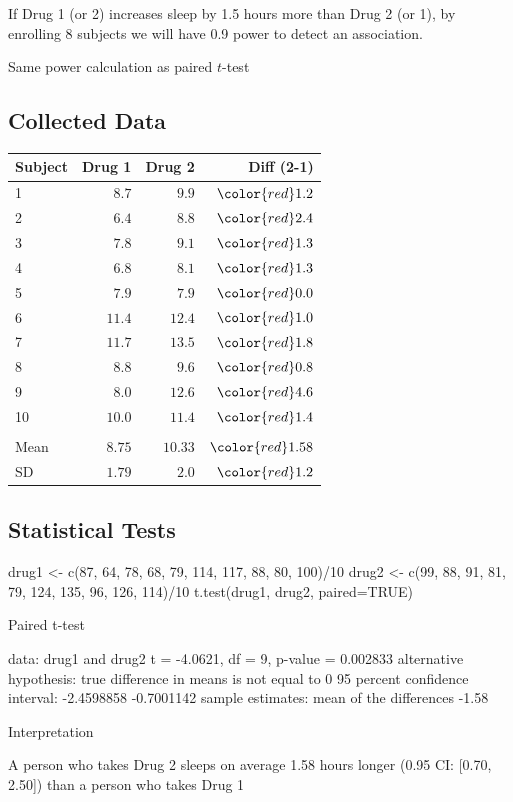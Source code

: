 \bi
\item If Drug 1 (or 2) increases sleep by 1.5 hours more than Drug 2 (or 1), by enrolling 8 subjects we will have 0.9 power to detect an association.
\item Same power calculation as paired $t$-test
\ei

\subsection{Collected Data}
\begin{table}[!htbp]
 \begin{center}
 \begin{tabular}{lrrr}\hline\hline
Subject & Drug 1 & Drug 2 & {\color{red}Diff (2-1)}
\\ \hline
1  &$8.7$ &$ 9.9$&$\color{red}1.2$\\
2  &$6.4$ &$ 8.8$&$\color{red}2.4$\\
3  &$7.8$ &$ 9.1$&$\color{red}1.3$\\
4  &$6.8$ &$ 8.1$&$\color{red}1.3$\\
5  &$7.9$ &$ 7.9$&$\color{red}0.0$\\
6  &$11.4$&$ 12.4$&$\color{red}1.0$\\
7  &$11.7$&$ 13.5$&$\color{red}1.8$\\
8  &$8.8$ &$ 9.6$&$\color{red}0.8$\\
9  &$8.0$ &$ 12.6$&$\color{red}4.6$\\
10 &$10.0$&$ 11.4$&$\color{red}1.4$\\ \\
Mean&$8.75$&$ 10.33$&$\color{red}1.58$\\
SD  &$1.79$&$ 2.0$  &$\color{red}1.2$\\
\hline
\end{tabular}
\end{center}
\end{table}

\subsection{Statistical Tests}
\begin{Schunk}
\begin{Sinput}
drug1 <- c(87, 64, 78, 68, 79, 114, 117, 88, 80, 100)/10
drug2 <- c(99, 88, 91, 81, 79, 124, 135, 96, 126, 114)/10
t.test(drug1, drug2, paired=TRUE)
\end{Sinput}
\begin{Soutput}

	Paired t-test

data:  drug1 and drug2
t = -4.0621, df = 9, p-value = 0.002833
alternative hypothesis: true difference in means is not equal to 0
95 percent confidence interval:
 -2.4598858 -0.7001142
sample estimates:
mean of the differences 
                  -1.58 
\end{Soutput}
\end{Schunk}
\bi
\item Interpretation
 \bi
 \item A person who takes Drug 2 sleeps on average 1.58 hours longer (0.95 CI: [0.70, 2.50]) than a person who takes Drug 1
 \ei
\ei

